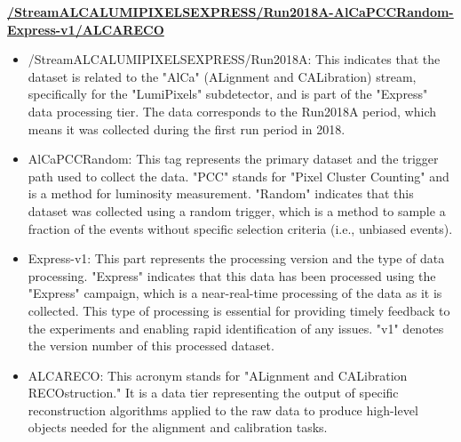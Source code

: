 
\textbf{\url{/StreamALCALUMIPIXELSEXPRESS/Run2018A-AlCaPCCRandom-Express-v1/ALCARECO}}


\begin{itemize}

\item /StreamALCALUMIPIXELSEXPRESS/Run2018A:
This indicates that the dataset is related to the "AlCa" (ALignment and CALibration) stream, specifically for the "LumiPixels" subdetector, and is part of the "Express" data processing tier. The data corresponds to the Run2018A period, which means it was collected during the first run period in 2018.

\item AlCaPCCRandom:
This tag represents the primary dataset and the trigger path used to collect the data. "PCC" stands for "Pixel Cluster Counting" and is a method for luminosity measurement. "Random" indicates that this dataset was collected using a random trigger, which is a method to sample a fraction of the events without specific selection criteria (i.e., unbiased events).

\item Express-v1:
This part represents the processing version and the type of data processing. "Express" indicates that this data has been processed using the "Express" campaign, which is a near-real-time processing of the data as it is collected. This type of processing is essential for providing timely feedback to the experiments and enabling rapid identification of any issues. "v1" denotes the version number of this processed dataset.

\item ALCARECO:
This acronym stands for "ALignment and CALibration RECOstruction." It is a data tier representing the output of specific reconstruction algorithms applied to the raw data to produce high-level objects needed for the alignment and calibration tasks.

\end{itemize}



